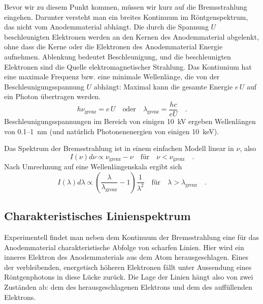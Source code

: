 \begin{marginfigure}
    \caption{Brems-Spektrum einer Wolfram-Anode bei $U= 15, 25, 35, 50$~kV. Daten von \cite{Gilfrich68}.}
    \label{fig:7_bremsstrahlung}
\end{marginfigure}

Bevor wir zu diesem Punkt kommen, müssen wir kurz auf die Bremsstrahlung eingehen. Darunter versteht man ein breites Kontinuum im Röntgenspektrum,  das nicht vom Anodemmaterial abhängt. Die durch die Spannung $U$ beschleunigten Elektronen werden an den Kernen des Anodemmaterial abgelenkt, ohne dass die Kerne oder die Elektronen des Anodemmaterial Energie aufnehmen. Ablenkung bedeutet Beschleunigung, und die beschleunigten Elektronen sind die Quelle  elektromagnetischer Strahlung.  Das Kontiunium hat eine maximale Frequenz bzw. eine minimale Wellenlänge, die von der Beschleunigungsspannung $U$ abhängt: Maximal kann die gesamte Energie $e \, U$ auf ein Photon übertragen werden.
\begin{equation}
    h \nu_\text{grenz} = e \, U \quad \text{oder} \quad
    \lambda_\text{grenz} = \frac{h c}{e U} \quad .
\end{equation}
Beschleunigungsspannungen im Bereich von einigen 10~kV ergeben Wellenlängen von 0.1--1~nm (und natürlich Photonenenergien von einigen 10~keV).

Das Spektrum der Bremsstrahlung ist in einem einfachen Modell linear in $\nu$, also 
\begin{equation}
    I(\nu) d\nu \propto \nu_\text{grenz} - \nu \quad \text{für} \quad  \nu < \nu_\text{grenz} \quad .
\end{equation}
Nach Umrechnung auf eine Wellenlängenskala ergibt sich
\begin{equation}
    I(\lambda) d\lambda \propto \left( \frac{\lambda}{\lambda_\text{grenz}} - 1 \right) \frac{1}{\lambda^2} 
    \quad \text{für} \quad  \lambda > \lambda_\text{grenz} \quad .
\end{equation}




\subsection{Charakteristisches Linienspektrum}

Experimentell findet man neben dem Kontinuum der Bremsstrahlung eine für das Anodemmaterial charakteristische Abfolge von scharfen Linien. Hier wird ein inneres Elektron des Anodemmaterials aus dem Atom herausgeschlagen. Eines der verbleibenden, energetisch höheren Elektronen fällt unter Aussendung eines Röntgenphotons in diese Lücke zurück. Die Lage der Linien hängt also von zwei Zuständen ab: dem des herausgeschlagenen Elektrons und dem des auffüllenden Elektrons.

